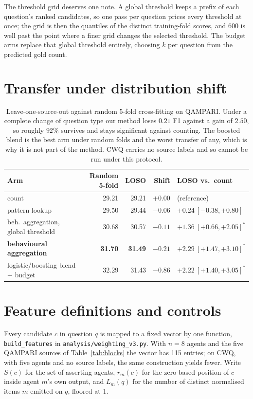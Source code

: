 \documentclass{article}
\begin{document}
The threshold grid deserves one note. A global threshold keeps a prefix of each question's ranked candidates, so one pass per question prices every threshold at once; the grid is then the quantiles of the distinct training-fold scores, and 600 is well past the point where a finer grid changes the selected threshold. The budget arms replace that global threshold entirely, choosing $k$ per question from the predicted gold count.

\section{Transfer under distribution shift}
\label{app:proc}

\begin{table}
  \caption{Leave-one-source-out against random 5-fold cross-fitting on QAMPARI. Under a complete change of question type our method loses $0.21$ F1 against a gain of $2.50$, so roughly $92\%$ survives and stays significant against counting. The boosted blend is the best arm under random folds and the worst transfer of any, which is why it is not part of the method. CWQ carries no source labels and so cannot be run under this protocol.}
  \label{tab:loso}
  \centering
  \begin{tabular}{lrrrl}
    \toprule
    Arm & Random 5-fold & LOSO & Shift & LOSO vs.\ count \\
    \midrule
    count                        & 29.21 & 29.21 & $+0.00$ & (reference) \\
    pattern lookup               & 29.50 & 29.44 & $-0.06$ & $+0.24\ [-0.38,+0.80]$ \\
    beh.\ aggregation, global threshold & 30.68 & 30.57 & $-0.11$ & $+1.36\ [+0.66,+2.05]^*$ \\
    \textbf{behavioural aggregation} & \textbf{31.70} & \textbf{31.49} & $\mathbf{-0.21}$ & $\mathbf{+2.29\ [+1.47,+3.10]^*}$ \\
    logistic/boosting blend + budget & 32.29 & 31.43 & $-0.86$ & $+2.22\ [+1.40,+3.05]^*$ \\
    \bottomrule
  \end{tabular}
\end{table}

\section{Feature definitions and controls}
\label{app:features}

Every candidate $c$ in question $q$ is mapped to a fixed vector by one function, \texttt{build\_features} in \texttt{analysis/weighting\_v3.py}. With $n=8$ agents and the five QAMPARI sources of Table~\ref{tab:blocks} the vector has 115 entries; on CWQ, with five agents and no source labels, the same construction yields fewer. Write $S(c)$ for the set of asserting agents, $r_m(c)$ for the zero-based position of $c$ inside agent $m$'s own output, and $L_m(q)$ for the number of distinct normalised items $m$ emitted on $q$, floored at 1.
\end{document}
